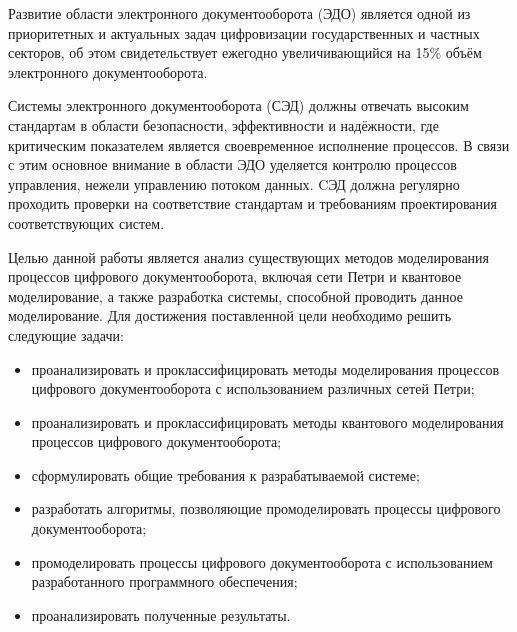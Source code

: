 {\par}

Развитие области электронного документооборота (ЭДО) является одной из приоритетных и актуальных задач цифровизации государственных и частных секторов, об этом свидетельствует ежегодно увеличивающийся на 15\% объём электронного документооборота\cite{dadaya}. 

Системы электронного документооборота (СЭД) должны отвечать высоким стандартам в области безопасности, эффективности и надёжности, где критическим показателем является своевременное исполнение процессов\cite{dadaya}. В связи с этим основное внимание в области ЭДО уделяется контролю процессов управления, нежели управлению потоком данных\cite{dadaya}. CЭД должна регулярно проходить проверки на соответствие стандартам и требованиям проектирования соответствующих систем\cite{dadaya}. 

Целью данной работы является анализ существующих методов моделирования процессов цифрового документооборота, включая сети Петри и квантовое моделирование, а также разработка системы, способной проводить данное моделирование. Для достижения поставленной цели необходимо решить следующие задачи:
\begin{itemize}[label=---]
	\item проанализировать и проклассифицировать методы моделирования процессов цифрового документооборота с использованием различных сетей Петри;
	\item проанализировать и проклассифицировать методы квантового моделирования процессов цифрового документооборота;
	\item сформулировать общие требования к разрабатываемой системе;
	\item разработать алгоритмы, позволяющие промоделировать процессы цифрового документооборота;
	\item промоделировать процессы цифрового документооборота с использованием разработанного программного обеспечения;
	\item проанализировать полученные результаты.
\end{itemize}

\clearpage
